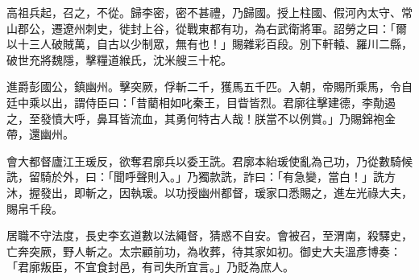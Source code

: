 \begin{pinyinscope}
 高祖兵起，召之，不從。歸李密，密不甚禮，乃歸國。授上柱國、假河內太守、常山郡公，遷遼州刺史，徙封上谷，從戰東都有功，為右武衛將軍。詔勞之曰：「爾以十三人破賊萬，自古以少制眾，無有也！」賜雜彩百段。別下軒轅、羅川二縣，破世充將魏隱，擊糧道緱氏，沈米艘三十柁。



 進爵彭國公，鎮幽州。擊突厥，俘斬二千，獲馬五千匹。入朝，帝賜所乘馬，令自廷中乘以出，謂侍臣曰：「昔藺相如叱秦王，目眥皆烈。君廓往擊建德，李勣遏之，至發憤大呼，鼻耳皆流血，其勇何特古人哉！朕當不以例賞。」乃賜錦袍金帶，還幽州。



 會大都督廬江王瑗反，欲奪君廓兵以委王詵。君廓本紿瑗使亂為己功，乃從數騎候詵，留騎於外，曰：「聞呼聲則入。」乃獨款詵，詐曰：「有急變，當白！」詵方沐，握發出，即斬之，因執瑗。以功授幽州都督，瑗家口悉賜之，進左光祿大夫，賜帛千段。



 居職不守法度，長史李玄道數以法繩督，猜惑不自安。會被召，至渭南，殺驛史，亡奔突厥，野人斬之。太宗顧前功，為收葬，待其家如初。御史大夫溫彥博奏：「君廓叛臣，不宜食封邑，有司失所宜言。」乃貶為庶人。



\end{pinyinscope}